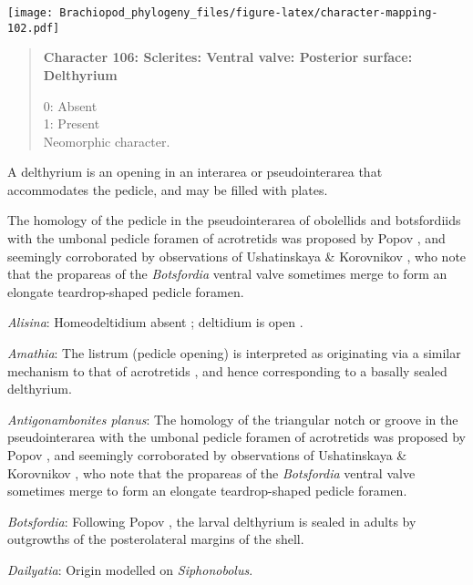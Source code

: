 \documentclass[openany]{book}
\theoremstyle{definition}
\theoremstyle{definition}
\theoremstyle{definition}
\theoremstyle{remark}
\begin{document}
\texttt{[image: Brachiopod\_phylogeny\_files/figure-latex/character-mapping-102.pdf]}

\begin{quote}
\textbf{Character 106: Sclerites: Ventral valve: Posterior surface:
Delthyrium}

0: Absent\\
1: Present\\
Neomorphic character.
\end{quote}

A delthyrium is an opening in an interarea or pseudointerarea that
accommodates the pedicle, and may be filled with plates.

The homology of the pedicle in the pseudointerarea of obolellids and
botsfordiids with the umbonal pedicle foramen of acrotretids was
proposed by Popov \citeyearpar{Popov1992TheCambrian}, and seemingly
corroborated by observations of Ushatinskaya \& Korovnikov
\citeyearpar{Ushatinskaya2016Revisionof}, who note that the propareas of
the \emph{Botsfordia} ventral valve sometimes merge to form an elongate
teardrop-shaped pedicle foramen.

\hypertarget{Alisina-coding-106}{}
\emph{Alisina}: Homeodeltidium absent
\citep[p.~153]{Williams2000LinguliformeaCraniiformea}; deltidium is open
\citep[see][fig. 4]{Topper2013Theoldest}.

\hypertarget{Amathia-coding-106}{}
\emph{Amathia}: The listrum (pedicle opening) is interpreted as
originating via a similar mechanism to that of acrotretids
\citep{Popov1992TheCambrian}, and hence corresponding to a basally
sealed delthyrium.

\hypertarget{Antigonambonites_planus-coding-106}{}
\emph{Antigonambonites planus}: The homology of the triangular notch or
groove in the pseudointerarea with the umbonal pedicle foramen of
acrotretids was proposed by Popov \citeyearpar{Popov1992TheCambrian},
and seemingly corroborated by observations of Ushatinskaya \& Korovnikov
\citeyearpar{Ushatinskaya2016Revisionof}, who note that the propareas of
the \emph{Botsfordia} ventral valve sometimes merge to form an elongate
teardrop-shaped pedicle foramen.

\hypertarget{Botsfordia-coding-106}{}
\emph{Botsfordia}: Following Popov \citeyearpar{Popov1992TheCambrian},
the larval delthyrium is sealed in adults by outgrowths of the
posterolateral margins of the shell.

\hypertarget{Dailyatia-coding-106}{}
\emph{Dailyatia}: Origin modelled on \emph{Siphonobolus}.
\end{document}
